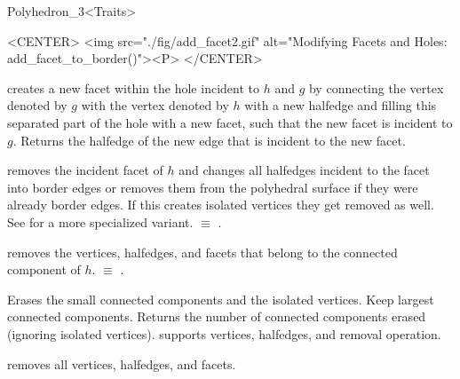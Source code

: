 \begin{ccRefClass}{Polyhedron_3<Traits>}
\begin{ccHtmlOnly}
    <CENTER>
    <img src="./fig/add_facet2.gif"
     alt="Modifying Facets and Holes: add_facet_to_border()"><P>
    </CENTER>
\end{ccHtmlOnly}

   {creates a new facet within the hole incident to $h$ and $g$ by
    connecting the vertex denoted by $g$ with the vertex denoted by $h$
    with a new halfedge and filling this separated part of the hole with
    a new facet, such that the new facet is incident to $g$.
    Returns the halfedge of the new edge that is incident to the new facet.
   }



    {removes the incident facet of $h$ and changes all halfedges incident
     to the facet into border edges or removes them from the
     polyhedral surface if they were already border edges.
     If this creates isolated vertices they get removed as well.
     See  for a more specialized variant.
      
      $\equiv$ .}

    {removes the  vertices, halfedges, and facets that belong to the
     connected component of $h$.
       $\equiv$
     .}

    {Erases the small connected components and the isolated vertices.
     Keep  largest connected components.
     Returns the number of connected components erased (ignoring isolated vertices).
      supports vertices, halfedges, and removal operation.}

    {removes all vertices, halfedges, and facets.}




\end{ccRefClass}
